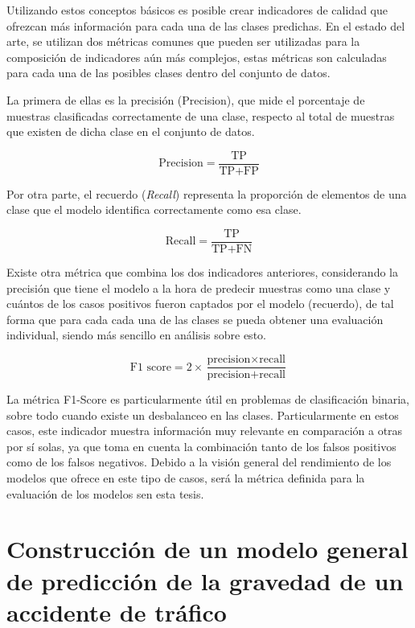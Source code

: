 \documentclass{uathesis-es}
\begin{document}
Utilizando estos conceptos básicos es posible crear indicadores de calidad que ofrezcan más información para cada una de las clases predichas. En el estado del arte, se utilizan dos métricas comunes que pueden ser utilizadas para la composición de indicadores aún más complejos, estas métricas son calculadas para cada una de las posibles clases dentro del conjunto de datos.

La primera de ellas es la precisión (Precision), que mide el porcentaje de muestras clasificadas correctamente de una clase, respecto al total de muestras que existen de dicha clase en el conjunto de datos.

$$\text{Precision} = \frac{{\text{TP}}}{{\text{TP} + \text{FP}}}$$

Por otra parte, el recuerdo (\textit{Recall}) representa la proporción de elementos de una clase que el modelo identifica correctamente como esa clase.

$$\text{Recall} = \frac{{\text{TP}}}{{\text{TP} + \text{FN}}}$$

Existe otra métrica que combina los dos indicadores anteriores, considerando la precisión que tiene el modelo a la hora de predecir muestras como una clase y cuántos de los casos positivos fueron captados por el modelo (recuerdo), de tal forma que para cada cada una de las clases se pueda obtener una evaluación individual, siendo más sencillo en análisis sobre esto. 

$$\text{F1 score} = 2 \times \frac{{\text{precision} \times \text{recall}}}{{\text{precision} + \text{recall}}}$$




La métrica F1-Score es particularmente útil en problemas de clasificación binaria, sobre todo cuando existe un desbalanceo en las clases. Particularmente en estos casos, este indicador muestra información muy relevante en comparación a otras por sí solas, ya que toma en cuenta la combinación tanto de los falsos positivos como de los falsos negativos. Debido a la visión general del rendimiento de los modelos que ofrece en este tipo de casos, será la métrica definida para la evaluación de los modelos sen esta tesis.




\chapter{Construcción de un modelo general de predicción de la gravedad de un accidente de tráfico}
\end{document}
